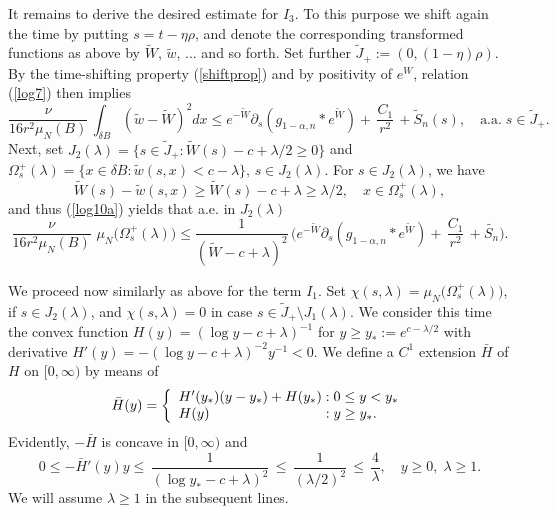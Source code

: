\documentclass[10pt]{article}
\begin{document}
It remains to derive the desired estimate for $I_3$. To this
purpose we shift again the time by putting $s=t-\eta\rho$, and
denote the corresponding transformed functions as above by
$\tilde{W}$, $\tilde{w}$, ... and so forth. Set further
$\tilde{J}_+:=(0,(1-\eta)\rho)$. By the time-shifting property
(\ref{shiftprop}) and by positivity of $e^W$, relation
(\ref{log7}) then implies
\begin{equation} \label{log10a}
\frac{\nu}{16r^2 \mu_N(B)}\,\int_{\delta B}
(\tilde{w}-\tilde{W})^2 dx \le e^{-\tilde{W}}
\partial_s(g_{1-\alpha,n}\ast
e^{\tilde{W}})+\,\frac{C_1}{r^2}\,+\tilde{S}_n(s),\quad
\mbox{a.a.}\;s\in \tilde{J}_+.
\end{equation}
Next, set $J_2(\lambda)=\{s\in
\tilde{J}_+:\tilde{W}(s)-c+\lambda/2\ge 0\}$ and
$\Omega_{s}^+(\lambda)=\{x\in \delta B:
\tilde{w}(s,x)<c-\lambda\},\,s\in J_2(\lambda)$. For $s\in
J_2(\lambda)$, we have
\[ \tilde{W}(s)-\tilde{w}(s,x)\ge
\tilde{W}(s)-c+\lambda\ge \lambda/2,\quad
x\in\Omega_{s}^+(\lambda),
\]
and thus (\ref{log10a}) yields that a.e. in $J_2(\lambda)$
\begin{equation} \label{log12}
\frac{\nu}{16r^2
\mu_N(B)}\,\,\mu_N\big(\Omega^+_s(\lambda)\big)\le
\frac{1}{(\tilde{W}-c+\lambda)^2}\,\Big(e^{-\tilde{W}}
\partial_s(g_{1-\alpha,n}\ast
e^{\tilde{W}})+\,\frac{C_1}{r^2}\,+\tilde{S_n}\Big).
\end{equation}

We proceed now similarly as above for the term $I_1$. Set
$\chi(s,\lambda)=\mu_N\big(\Omega^+_{s}(\lambda)\big)$, if $s\in
J_2(\lambda)$, and $\chi(s,\lambda)=0$ in case $s\in
\tilde{J}_+\setminus J_1(\lambda)$. We consider this time the
convex function $H(y)=(\log y-c+\lambda)^{-1}$ for $y\ge
y_*:=e^{c-\lambda/2}$ with derivative $H'(y)=-(\log
y-c+\lambda)^{-2} y^{-1}<0$. We define a $C^1$ extension $\bar{H}$
of $H$ on $[0,\infty)$ by means of
\[
\bar{H}(y)=\left\{ \begin{array}{l@{\;:\;}l}
H'(y_*)(y-y_*)+H(y_*) & 0\le y< y_* \\
H(y) & y\ge y_*.
\end{array} \right.
\]
Evidently, $-\bar{H}$ is concave in $[0,\infty)$ and
\begin{equation} \label{log13}
0\le-\bar{H}'(y)y \le \,\frac{1}{(\log
y_*-c+\lambda)^2}\,\le\,\frac{1}{(\lambda/2)^2}\,\le
\,\frac{4}{\lambda},\quad y \ge 0,\;\lambda\ge 1.
\end{equation}
We will assume $\lambda\ge 1$ in the subsequent lines.
\end{document}
